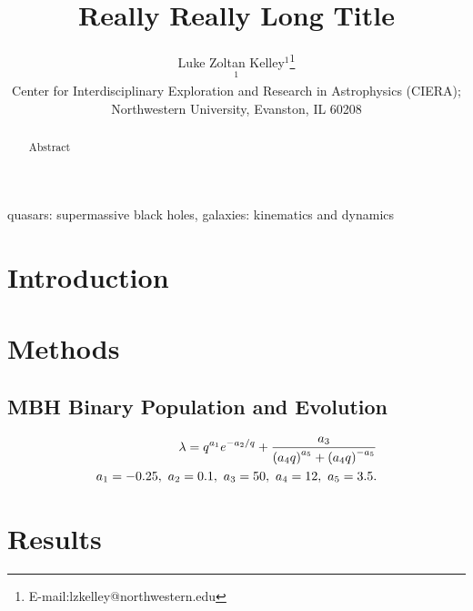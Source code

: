 \documentclass[useAMS, usenatbib]{mnras}
\title[Short Title]{Really Really Long Title}
\author[L.Z.~Kelley et al.]{
    Luke Zoltan Kelley$^{1}$\thanks{E-mail:lzkelley@northwestern.edu}
    \vspace{0.1in} \\
    $^{1}$ \begin{minipage}[t]{\linewidth} Center for Interdisciplinary Exploration and Research in Astrophysics (CIERA); Northwestern University, Evanston, IL 60208 \end{minipage}
}
\begin{document}
\pagerange{\pageref{firstpage}--\pageref{lastpage}} 

\maketitle
\label{firstpage}

\begin{abstract}
    Abstract
\end{abstract}

\begin{keywords}
quasars: supermassive black holes, galaxies: kinematics and dynamics
\end{keywords}



\section{Introduction}
    \label{sec:intro}


\section{Methods}
    \label{sec:meth}

    \subsection{MBH Binary Population and Evolution}
        \label{sec:meth_mbhb}

        \begin{align}
            \label{eq:acc_rat}
            \begin{split}
            \lambda = q^{a_1} e^{-a_2/q} + \frac{a_3}{\left(a_4 q\right)^{a_5} + \left( a_4 q \right)^{-a_5}} \\
            a_1 = -0.25,  \,\,  a_2 = 0.1,  \,\,  a_3 = 50,  \,\,  a_4 = 12,  \,\,  a_5 = 3.5.
            \end{split}
        \end{align}

        \begin{figure*}
            \centering
            \texttt{[image: \{\{figs/0\_schematic]}}}
            \caption{Schematic representation of the binary.}
            \label{fig:0_schematic}
        \end{figure*}

\section{Results}
    \label{sec:res}
\end{document}
